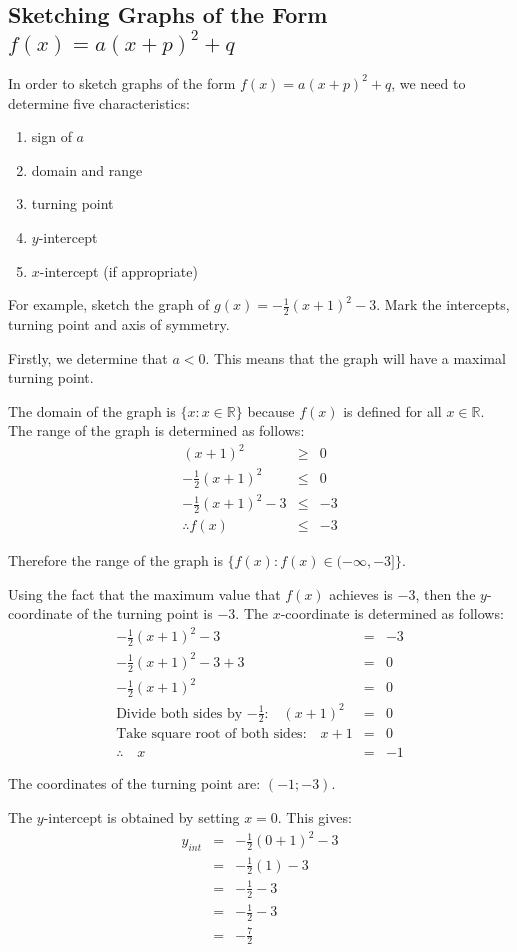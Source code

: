 \subsection{Sketching Graphs of the Form $f(x)=a(x+p)^2+q$}
In order to sketch graphs of the form $f(x)=a(x+p)^2+q$, we need to determine five characteristics:
\begin{enumerate}
\item{sign of $a$}
\item{domain and range}
\item{turning point}
\item{$y$-intercept}
\item{$x$-intercept (if appropriate)}
\end{enumerate}

For example, sketch the graph of $g(x)=-\frac{1}{2}(x+1)^2-3$. Mark the intercepts, turning point and axis of symmetry.

Firstly, we determine that $a<0$. This means that the graph will have a maximal turning point.

The domain of the graph is $\{x:x\in\mathbb{R}\}$ because $f(x)$ is defined for all $x\in \mathbb{R}$. The range of the graph is determined as follows:
\begin{eqnarray*}
(x+1)^2 &\ge& 0\\
-\frac{1}{2}(x+1)^2 &\le& 0\\
-\frac{1}{2}(x+1)^2-3 &\le& -3\\
\therefore f(x) &\le& -3
\end{eqnarray*}

Therefore the range of the graph is $\{f(x):f(x)\in(-\infty,-3]\}$.

Using the fact that the maximum value that $f(x)$ achieves is $-3$, then the $y$-coordinate of the turning point is $-3$. The $x$-coordinate is determined as follows:
\begin{eqnarray*}
-\frac{1}{2}(x+1)^2-3 &=& -3\\
-\frac{1}{2}(x+1)^2-3+3 &=& 0\\
-\frac{1}{2}(x+1)^2 &=& 0\\
\mbox{Divide both sides by $-\frac{1}{2}$:} \quad (x+1)^2 &=& 0\\
\mbox{Take square root of both sides:} \quad x+1 &=& 0\\
\therefore \quad x&=&-1
\end{eqnarray*}

The coordinates of the turning point are: $(-1;-3)$.

The $y$-intercept is obtained by setting $x=0$. This gives:
\begin{eqnarray*}
y_{int} &=&-\frac{1}{2}(0+1)^2-3\\
&=&-\frac{1}{2}(1)-3\\
&=&-\frac{1}{2}-3\\
&=&-\frac{1}{2}-3\\
&=&-\frac{7}{2}
\end{eqnarray*}

